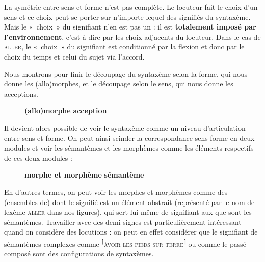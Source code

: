 La symétrie entre sens et forme n’est pas complète. Le locuteur fait le choix d’un sens et ce choix peut se porter sur n’importe lequel des signifiés du syntaxème. Mais le «~choix~» du signifiant n’en est pas un : il est \textbf{totalement imposé par l’environnement}, c’est-à-dire par les choix adjacents du locuteur. Dans le cas de \textsc{aller}, le «~choix~» du signifiant est conditionné par la flexion et donc par le choix du temps et celui du sujet via l’accord.

Nous montrons pour finir le découpage du syntaxème selon la forme, qui nous donne les (allo)morphes, et le découpage selon le sens, qui nous donne les acceptions.

\begin{figure}

           \textbf{(allo)morphe}             \textbf{acception}

\caption{\label{fig:}}
\end{figure}

Il devient alors possible de voir le syntaxème comme un niveau d’articulation entre sens et forme. On peut ainsi scinder la correspondance sens-forme en deux modules et voir les sémantèmes et les morphèmes comme les éléments respectifs de ces deux modules :

\begin{figure}

    \textbf{morphe et morphème}         \textbf{sémantème}

\caption{\label{fig:}}
\end{figure}

En d’autres termes, on peut voir les morphes et morphèmes comme des (ensembles de)  dont le signifié est un élément abstrait (représenté par le nom de lexème \textsc{aller} dans nos figures), qui sert lui même de signifiant aux  que sont les sémantèmes. Travailler avec des demi-signes est particulièrement intéressant quand on considère des locutions : on peut en effet considérer que le signifiant de sémantèmes complexes comme \textsuperscript{⌈}\textsc{àvoir} \textsc{les} \textsc{pieds} \textsc{sur} \textsc{terre}\textsuperscript{⌉} ou comme le passé composé sont des configurations de syntaxèmes.

